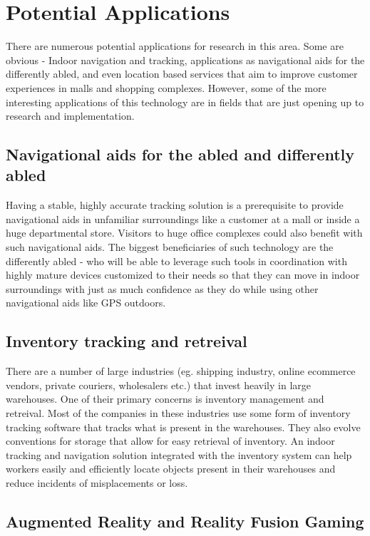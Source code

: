 \section{Potential Applications}

There are numerous potential applications for research in this area. Some are
obvious - Indoor navigation and tracking, applications as navigational aids for
the differently abled, and even location based services that aim to improve
customer experiences in malls and shopping complexes. However, some of 
the more interesting applications of this technology are in fields that 
are just opening up to research and implementation. 

\subsection{Navigational aids for the abled and differently abled}

Having a stable, highly accurate tracking solution is a prerequisite to 
provide navigational aids in unfamiliar surroundings like a customer at 
a mall or inside a huge departmental store. Visitors to huge office complexes
could also benefit with such navigational aids. The biggest beneficiaries
of such technology are the differently abled - who will be able to 
leverage such tools in coordination with highly mature devices customized 
to their needs so that they can move in indoor surroundings with just as 
much confidence as they do while using other navigational aids like GPS 
outdoors.


\subsection{Inventory tracking and retreival}

There are a number of large industries (eg. shipping industry, online ecommerce
vendors, private couriers, wholesalers etc.) that invest heavily in large
warehouses. One of their primary concerns is inventory management and retreival.
Most of the companies in these industries use some form of inventory tracking 
software that tracks what is present in the warehouses. They also evolve
conventions for storage that allow for easy retrieval of inventory. An indoor
tracking and navigation solution integrated with the inventory system can help 
workers easily and efficiently locate objects present in their warehouses and 
reduce incidents of misplacements or loss.

\subsection{Augmented Reality and Reality Fusion Gaming}


